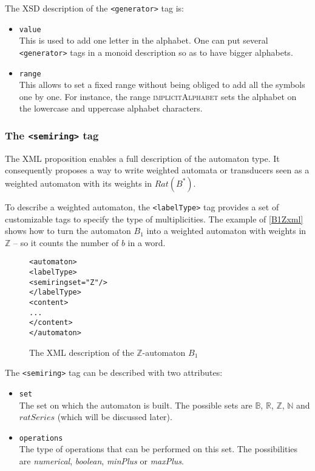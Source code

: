\documentclass[a4paper]{article}
\newcommand{\xtag}[1]{\texttt{<#1>}}
\newcommand{\xattr}[1]{\texttt{#1}}
\def\typetagend{\xtag{/labelType}}
\def\typetag{\xtag{labelType}}
\def\semiringtag{\xtag{semiring}}
\def\generatortag{\xtag{generator}}
\begin{document}
The XSD description of the \generatortag{} tag is:
\begin{itemize}
\item \xattr{value}\\
  This is used to add one letter in the alphabet. One can put several
  \generatortag{} tags in a monoid description so as to have bigger
  alphabets.
\item \xattr{range}\\
  This allows to set a fixed range without being obliged to add all
  the symbols one by one. For instance, the range \textsc{implicitAlphabet}
  sets the alphabet on the lowercase and uppercase alphabet characters.
\end{itemize}

\subsubsection{The \semiringtag{} tag}

The XML proposition enables a full description of the automaton type.
It consequently proposes a way to write weighted automata or
transducers seen as a weighted automaton with its weights in
$Rat(B^*)$.

To describe a weighted automaton, the \typetag{} tag provides a set of
customizable tags to specify the type of multiplicities. The example
of \autoref{B1Zxml} shows how to turn the automaton $B_1$ into a
weighted automaton with weights in ${\mathbb Z}$ -- so it counts the
number of $b$ in a word.

\begin{figure}[ht]
  \small
  \begin{center}
\begin{alltt}
<automaton>
  \typetag{}
     <semiring set="Z"/>
  \typetagend{}
  <content>
  ...
  </content>
</automaton>
\end{alltt}

\caption{The XML description of the $\mathbb{Z}$-automaton $B_1$}
\label{B1Zxml}
  \end{center}
\end{figure}

The \semiringtag{} tag can be described with two attributes:
\begin{itemize}
\item \xattr{set}\\
  The set on which the automaton is built. The possible sets are
  ${\mathbb B}$, ${\mathbb R}$, ${\mathbb Z}$, ${\mathbb N}$ and
  $ratSeries$ (which will be discussed later).
\item \xattr{operations}\\
  The type of operations that can be performed on this set.  The
  possibilities are \textit{numerical}, \textit{boolean},
  \textit{minPlus} or \textit{maxPlus}.
\end{itemize}
\end{document}
